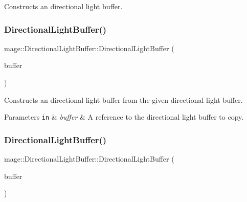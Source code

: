 Constructs an directional light buffer. \hypertarget{structmage_1_1_directional_light_buffer_a2b61889818f441416421511aa1dcd294}{}\label{structmage_1_1_directional_light_buffer_a2b61889818f441416421511aa1dcd294} 
\subsubsection{\texorpdfstring{Directional\+Light\+Buffer()}{DirectionalLightBuffer()}\hspace{0.1cm}{\footnotesize\ttfamily [2/3]}}
{\footnotesize\ttfamily mage\+::\+Directional\+Light\+Buffer\+::\+Directional\+Light\+Buffer (\begin{DoxyParamCaption}\item[{const \hyperlink{structmage_1_1_directional_light_buffer}{Directional\+Light\+Buffer} \&}]{buffer }\end{DoxyParamCaption})\hspace{0.3cm}{\ttfamily [default]}}

Constructs an directional light buffer from the given directional light buffer.


\begin{DoxyParams}[1]{Parameters}
\mbox{\tt in}  & {\em buffer} & A reference to the directional light buffer to copy. \\
\hline
\end{DoxyParams}
\hypertarget{structmage_1_1_directional_light_buffer_aed86ef6ac6e2dfd9cda2c2be844ceca5}{}\label{structmage_1_1_directional_light_buffer_aed86ef6ac6e2dfd9cda2c2be844ceca5} 
\subsubsection{\texorpdfstring{Directional\+Light\+Buffer()}{DirectionalLightBuffer()}\hspace{0.1cm}{\footnotesize\ttfamily [3/3]}}
{\footnotesize\ttfamily mage\+::\+Directional\+Light\+Buffer\+::\+Directional\+Light\+Buffer (\begin{DoxyParamCaption}\item[{\hyperlink{structmage_1_1_directional_light_buffer}{Directional\+Light\+Buffer} \&\&}]{buffer }\end{DoxyParamCaption})\hspace{0.3cm}{\ttfamily [default]}}

